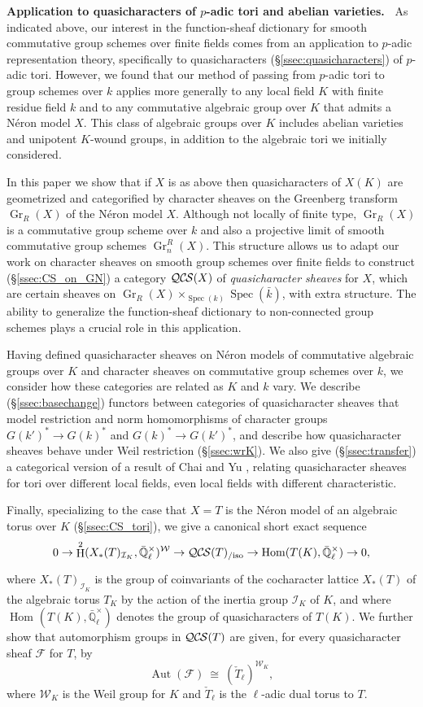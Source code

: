 \documentclass[10pt]{amsart}
\theoremstyle{plain}
\theoremstyle{definition}
\newcommand{\EE}{\mathbb{\bar Q}_\ell}
\newcommand{\bFq}{\bar{k}}
\newcommand{\Fq}{k}
\newcommand{\EEx}{\EE^\times}
\newcommand{\Weil}[1]{\mathcal{W}_{#1}}
\DeclareMathOperator{\Aut}{Aut}
\DeclareMathOperator{\Hom}{Hom}
\DeclareMathOperator{\Gr}{Gr}
\DeclareMathOperator{\Hh}{H}
\newcommand{\Spec}[1]{{\operatorname{Spec}(#1)}}
\newcommand{\iso}{{\ \cong\ }}
\newcommand{\cs}[1]{{\mathcal{#1}}}
\newcommand{\QCS}{{\mathcal{QC\hskip-0.8pt S}}}
\newcommand{\QCSiso}[1]{\QCS(#1)_{/\text{iso}}}
\begin{document}
\medskip
\noindent\textbf{Application to quasicharacters of $p$-adic tori and abelian varieties.\ }
As indicated above, our interest in the function-sheaf dictionary for smooth commutative group schemes
over finite fields comes from an application to $p$-adic representation theory,
specifically to quasicharacters (\S\ref{ssec:quasicharacters}) of $p$-adic tori.
However, we found that our method of passing from $p$-adic tori to group schemes over $\Fq$ applies more generally to
any local field $K$ with finite residue field $\Fq$ and to any commutative algebraic group over $K$ that admits a N\'eron model $X$.
This class of algebraic groups over $K$ includes abelian varieties and unipotent $K$-wound groups,
in addition to the algebraic tori we initially considered.

In this paper we show that if $X$ is as above then quasicharacters of $X(K)$ are geometrized and categorified by character sheaves on the
Greenberg transform $\Gr_R(X)$ of the N\'eron model $X$.
Although not locally of finite type, $\Gr_R(X)$ is a commutative group scheme over $\Fq$ and also a projective limit
of smooth commutative group schemes $\Gr^R_n(X)$.
This structure allows us to adapt our work on character sheaves on smooth group schemes over
finite fields to construct (\S\ref{ssec:CS_on_GN}) a category $\QCS(X)$
of {\it quasicharacter sheaves} for $X$, which are certain sheaves on $\Gr_R(X)\times_{\Spec{\Fq}} \Spec{\bFq}$, with extra structure.
The ability to generalize the function-sheaf dictionary to non-connected group schemes plays a crucial role in this application.

Having defined quasicharacter sheaves on N\'eron models of commutative algebraic groups over $K$
and character sheaves on commutative group schemes over $\Fq$, we consider how
these categories are related as $K$ and $\Fq$ vary.  We describe (\S\ref{ssec:basechange}) functors between categories
of quasicharacter sheaves that model restriction and norm homomorphisms of character groups $G(k')^* \to G(k)^*$ and $G(k)^* \to G(k')^*$,
and describe how quasicharacter sheaves behave under Weil restriction (\S\ref{ssec:wrK}).  We also give (\S\ref{ssec:transfer})
a categorical version of a result of Chai and Yu \cite{chai-yu:01a},
relating quasicharacter sheaves for tori over different local fields, even local fields
with different characteristic.

Finally, specializing to the case that $X = T$ is the N\'eron model of an algebraic torus over $K$ (\S\ref{ssec:CS_tori}), 
we give a canonical short exact sequence 
\[
0 \to \Hh^2(X_*(T)_{\mathcal{I}_K},\EEx)^{\Weil{}} \to \QCSiso{T} \to \Hom_\text{}(T(K),\EEx) \to 0,
\]
where $X_*(T)_{\mathcal{I}_K}$ is the group of coinvariants of the cocharacter lattice $X_*(T)$ of the algebraic torus
$T_K$ by the action of the inertia group $\mathcal{I}_K$ of $K$, and where $\Hom_\text{}(T(K),\EEx)$
denotes the group of quasicharacters of $T(K)$.
We further show that automorphism groups in $\QCS(T)$ are given, for every quasicharacter sheaf $\cs{F}$ for $T$, by
\[
\Aut(\cs{F}) \iso (\check{T}_\ell)^{\Weil{K}},
\]
where $\Weil{K}$ is the Weil group for $K$ and $\check{T}_\ell$ is the $\ell$-adic dual torus to $T$.
\end{document}
